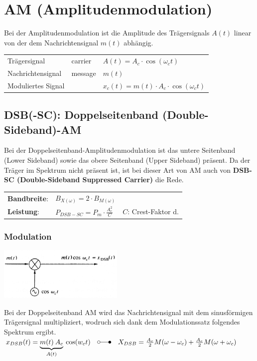 \section{AM (Amplitudenmodulation)}
Bei der Amplitudenmodulation ist die Amplitude des Trägersignals $A(t)$ linear von der dem
Nachrichtensignal $m(t)$ abhängig.
\begin{tabular}{l l l}
Trägersignal & carrier & $A(t)=A_c \cdot \cos(\omega_c t)$ \\
Nachrichtensignal & message & $m(t)$ \\
Moduliertes Signal & & $ x_c(t) = m(t) \cdot A_c \cdot \cos(\omega_c t) $ \\
\end{tabular}


\subsection{DSB(-SC): Doppelseitenband (Double-Sideband)-AM}
Bei der Doppelseitenband-Amplitudenmodulation ist das untere Seitenband (Lower
Sideband) sowie das
obere Seitenband (Upper Sideband) präsent. Da der Träger im Spektrum nicht
präsent ist, ist bei dieser Art von AM auch von \textbf{DSB-SC (Double-Sideband Suppressed Carrier)} die Rede. \\ 
\begin{tabular}{l l l}
	\textbf{Bandbreite}: & $B_{X(\omega)} = 2 \cdot B_{M(\omega)}$ & \\
	\textbf{Leistung}: & $P_{DSB-SC} = P_m \cdot \frac{A_c^2}{C}$ & $C$: Crest-Faktor d. \\
\end{tabular}

\subsubsection{Modulation}
\begin{minipage}[c][2.7cm][t]{6.5cm}
    \includegraphics[width=6cm]{bilder/am_dsb_modulation.png}
\end{minipage}
\begin{minipage}[c][2.7cm][t]{11.5cm}
Bei der Doppelseitenband AM wird das Nachrichtensignal mit dem sinusförmigen Trägersignal
multipliziert, wodruch sich dank dem Modulationssatz folgendes Spektrum ergibt. \\
	$ x_{DSB}(t) = \underbrace{m(t) \: A_c}_{A(t)} \: \cos(w_c t) \quad \laplace 
	\quad X_{DSB} = \frac{A_c}{2}M(\omega - \omega_c) + \frac{A_c}{2}M(\omega + \omega_c)$
\end{minipage}

